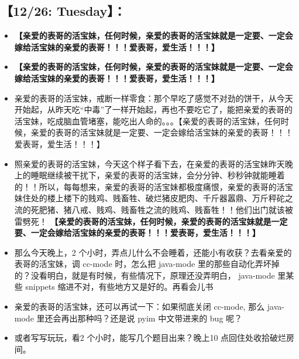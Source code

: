 \documentclass[9pt, b5paper]{article}
\begin{document}
\subsection{【12/26: Tuesday】：}
\label{sec-2-9}
\begin{itemize}
\item \textbf{【亲爱的表哥的活宝妹，任何时候，亲爱的表哥的活宝妹就是一定要、一定会嫁给活宝妹的亲爱的表哥！！！爱表哥，爱生活！！！】}
\item \textbf{【亲爱的表哥的活宝妹，任何时候，亲爱的表哥的活宝妹就是一定要、一定会嫁给活宝妹的亲爱的表哥！！！爱表哥，爱生活！！！】}
\item 亲爱的表哥的活宝妹，戒断一样零食：那个早吃了感觉不对劲的饼干，从今天开始起，从昨天吃“中毒”了一样开始起，再也不要吃它了，能把亲爱的表哥的活宝妹，吃成脑血管堵塞，能吃出人命的。。。【亲爱的表哥的活宝妹，任何时候，亲爱的表哥的活宝妹就是一定要、一定会嫁给活宝妹的亲爱的表哥！！！爱表哥，爱生活！！！】
\item 照亲爱的表哥的活宝妹，今天这个样子看下去，在亲爱的表哥的活宝妹昨天晚上的睡眠继续被干扰下，亲爱的表哥的活宝妹，会分分钟、秒秒钟就能睡着的！！所以，每每想来，亲爱的表哥的活宝妹都极度痛恨，亲爱的表哥的活宝妹住处的楼上楼下的贱鸡、贱畜牲、破烂猪皮肥肉、千斤器嚣鼎、万斤秤砣之流的死肥猪、猪八戒、贱鸡、贱畜牲之流的贱鸡、贱畜牲！！他们出门就该被雷劈死！ \textbf{【亲爱的表哥的活宝妹，任何时候，亲爱的表哥的活宝妹就是一定要、一定会嫁给活宝妹的亲爱的表哥！！！爱表哥，爱生活！！！】}
\item 那么今天晚上，2 个小时，弄点儿什么不会睡着，还能小有收获？去看亲爱的表哥的活宝妹，调 cc-mode 时，怎么把 java-mode 里的那些自动化弄坏掉的？没看明白，就是有时候，有些情况下，原理还没弄明白， java-mode 里某些 snippets 缩进不对，有些地方又是好的。再看会儿书
\item 亲爱的表哥的活宝妹，还可以再试一下：如果彻底关闭 cc-mode, 那么 java-mode 里还会再出那种吗？还是说 pyim 中文带进来的 bug 呢？
\item 或者写写玩玩，看2 个小时，能写几个题目出来？晚上10 点回住处收拾破烂房间。
\end{itemize}
\end{document}
